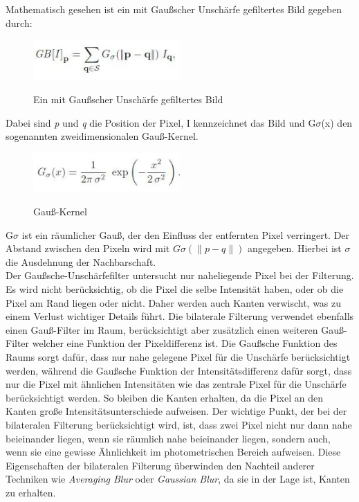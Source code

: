 Mathematisch gesehen ist ein mit Gaußscher Unschärfe gefiltertes Bild gegeben durch:
\begin{figure}[H]
    \centering
    \includegraphics[width=0.5\textwidth]{pics/GBFilteredPic.jpeg}
    \caption{Ein mit Gaußscher Unschärfe gefiltertes Bild}
    \cite{GBfilteredPicture}
    \label{fig:anpr_2}
    \end{figure}
Dabei sind \textit{p} und \textit{q} die Position der Pixel, I kennzeichnet das Bild und G\(\sigma\)(x) den sogenannten zweidimensionalen Gauß-Kernel. 
\begin{figure}[H]
    \centering
    \includegraphics[width=0.5\textwidth]{pics/Gaussian-Filter-Formula-2.jpeg}
    \caption{Gauß-Kernel}
    \cite{GBfilteredPicture2}
    \label{fig:anpr_3}
    \end{figure}
    G\(\sigma\) ist ein räumlicher Gauß, der den Einfluss der entfernten Pixel verringert. Der Abstand zwischen den Pixeln wird mit \(G\sigma(\|p-q\|)\) angegeben. Hierbei ist \(\sigma\) die Ausdehnung der Nachbarschaft.\\
    Der Gaußsche-Unschärfefilter untersucht nur naheliegende Pixel bei der Filterung. Es wird nicht berücksichtig, ob die Pixel die selbe Intensität haben, oder ob die Pixel am Rand liegen oder nicht. Daher werden auch Kanten verwischt, was zu einem Verlust wichtiger Details führt. Die bilaterale Filterung verwendet ebenfalls einen Gauß-Filter im Raum, berücksichtigt aber zusätzlich einen weiteren Gauß-Filter welcher eine Funktion der Pixeldifferenz ist. Die Gaußsche Funktion des Raums sorgt dafür, dass nur nahe gelegene Pixel für die Unschärfe berücksichtigt werden, während die Gaußsche Funktion der Intensitätsdifferenz dafür sorgt, dass nur die Pixel mit ähnlichen Intensitäten wie das zentrale Pixel für die Unschärfe berücksichtigt werden. So bleiben die Kanten erhalten, da die Pixel an den Kanten große Intensitätsunterschiede aufweisen.
    Der wichtige Punkt, der bei der bilateralen Filterung berücksichtigt wird, ist, dass zwei Pixel nicht nur dann nahe beieinander liegen, wenn sie räumlich nahe beieinander liegen, sondern auch, wenn sie eine gewisse Ähnlichkeit im photometrischen Bereich aufweisen. Diese Eigenschaften der bilateralen Filterung überwinden den Nachteil anderer Techniken wie \textit{Averaging Blur} oder \textit{Gaussian Blur}, da sie in der Lage ist, Kanten zu erhalten.\\
